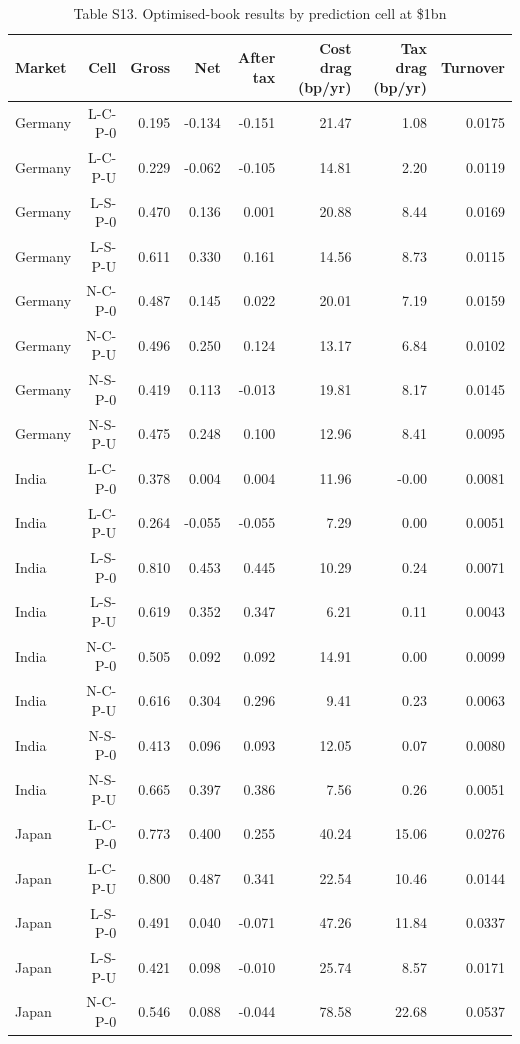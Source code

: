 \begin{table}[t]
\centering
\small
\caption{Table S13. Optimised-book results by prediction cell at \$1bn}
\label{tab:s13}
\begin{tabular}{lrrrrrrr}
\toprule
Market & Cell & Gross & Net & After tax & Cost drag (bp/yr) & Tax drag (bp/yr) & Turnover \\
\midrule
Germany & L-C-P-0 & 0.195 & -0.134 & -0.151 & 21.47 & 1.08 & 0.0175 \\
Germany & L-C-P-U & 0.229 & -0.062 & -0.105 & 14.81 & 2.20 & 0.0119 \\
Germany & L-S-P-0 & 0.470 & 0.136 & 0.001 & 20.88 & 8.44 & 0.0169 \\
Germany & L-S-P-U & 0.611 & 0.330 & 0.161 & 14.56 & 8.73 & 0.0115 \\
Germany & N-C-P-0 & 0.487 & 0.145 & 0.022 & 20.01 & 7.19 & 0.0159 \\
Germany & N-C-P-U & 0.496 & 0.250 & 0.124 & 13.17 & 6.84 & 0.0102 \\
Germany & N-S-P-0 & 0.419 & 0.113 & -0.013 & 19.81 & 8.17 & 0.0145 \\
Germany & N-S-P-U & 0.475 & 0.248 & 0.100 & 12.96 & 8.41 & 0.0095 \\
India & L-C-P-0 & 0.378 & 0.004 & 0.004 & 11.96 & -0.00 & 0.0081 \\
India & L-C-P-U & 0.264 & -0.055 & -0.055 & 7.29 & 0.00 & 0.0051 \\
India & L-S-P-0 & 0.810 & 0.453 & 0.445 & 10.29 & 0.24 & 0.0071 \\
India & L-S-P-U & 0.619 & 0.352 & 0.347 & 6.21 & 0.11 & 0.0043 \\
India & N-C-P-0 & 0.505 & 0.092 & 0.092 & 14.91 & 0.00 & 0.0099 \\
India & N-C-P-U & 0.616 & 0.304 & 0.296 & 9.41 & 0.23 & 0.0063 \\
India & N-S-P-0 & 0.413 & 0.096 & 0.093 & 12.05 & 0.07 & 0.0080 \\
India & N-S-P-U & 0.665 & 0.397 & 0.386 & 7.56 & 0.26 & 0.0051 \\
Japan & L-C-P-0 & 0.773 & 0.400 & 0.255 & 40.24 & 15.06 & 0.0276 \\
Japan & L-C-P-U & 0.800 & 0.487 & 0.341 & 22.54 & 10.46 & 0.0144 \\
Japan & L-S-P-0 & 0.491 & 0.040 & -0.071 & 47.26 & 11.84 & 0.0337 \\
Japan & L-S-P-U & 0.421 & 0.098 & -0.010 & 25.74 & 8.57 & 0.0171 \\
Japan & N-C-P-0 & 0.546 & 0.088 & -0.044 & 78.58 & 22.68 & 0.0537 \\

\end{tabular}
\end{table}
